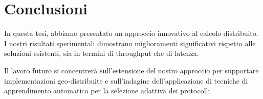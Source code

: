 \documentclass[master,italian,fem,lof,lot]{tvthesis}
\begin{document}
\lipsum[3]

\chapter{Conclusioni}
\label{ch:conclusions}

In questa tesi, abbiamo presentato un approccio innovativo al calcolo distribuito.
I nostri risultati sperimentali dimostrano miglioramenti significativi rispetto alle soluzioni esistenti, sia in termini di throughput che di latenza.

Il lavoro futuro si concentrerà sull’estensione del nostro approccio per supportare implementazioni geo-distribuite e sull’indagine dell’applicazione di tecniche di apprendimento automatico per la selezione adattiva dei protocolli.





\end{document}
